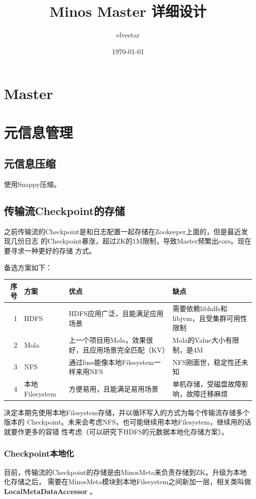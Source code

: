 \documentclass[11pt]{article}
\author{elvestar}
\date{\today}
\title{Minos Master 详细设计}
\begin{document}
\maketitle
\tableofcontents


\section{Master}
\label{sec-1}
\section{元信息管理}
\label{sec-2}
\subsection{元信息压缩}
\label{sec-2-1}
使用Snappy压缩。

\subsection{传输流Checkpoint的存储}
\label{sec-2-2}

之前传输流的Checkpoint是和日志配置一起存储在Zookeeper上面的，但是最近发现几份日志
的Checkpoint暴涨，超过ZK的1M限制，导致Master频繁出core。现在要寻求一种更好的存储
方式。

备选方案如下：
\begin{center}
\begin{tabular}{rlll}
序号 & 方案 & 优点 & 缺点\\
\hline
1 & HDFS & HDFS应用广泛，且能满足应用场景 & 需要依赖libhdfs和libjvm，且受集群可用性限制\\
2 & Mola & 上一个项目用Mola，效果很好，且应用场景完全匹配（KV） & Mola的Value大小有限制，是4M\\
3 & NFS & 通过fuse能像本地Filesystem一样来用NFS & NFS刚面世，稳定性还未知\\
4 & 本地Filesystem & 方便易用，且能满足易用场景 & 单机存储，受磁盘故障影响，故障迁移麻烦\\
\end{tabular}
\end{center}

决定本期先使用本地Filesystem存储，并以循环写入的方式为每个传输流存储多个版本的
Checkpoint。未来会考虑NFS，也可能继续用本地Filesystem，继续用的话就要作更多的容错
性考虑（可以研究下HDFS的元数据本地化存储方案）。

\subsubsection{Checkpoint本地化}
\label{sec-2-2-1}
目前，传输流的Checkpoint的存储是由MinosMeta来负责存储到ZK。升级为本地化存储之后，
需要在MinosMeta模块到本地Filesystem之间新加一层，相关类叫做
\textbf{LocalMetaDataAccessor} 。
\end{document}
